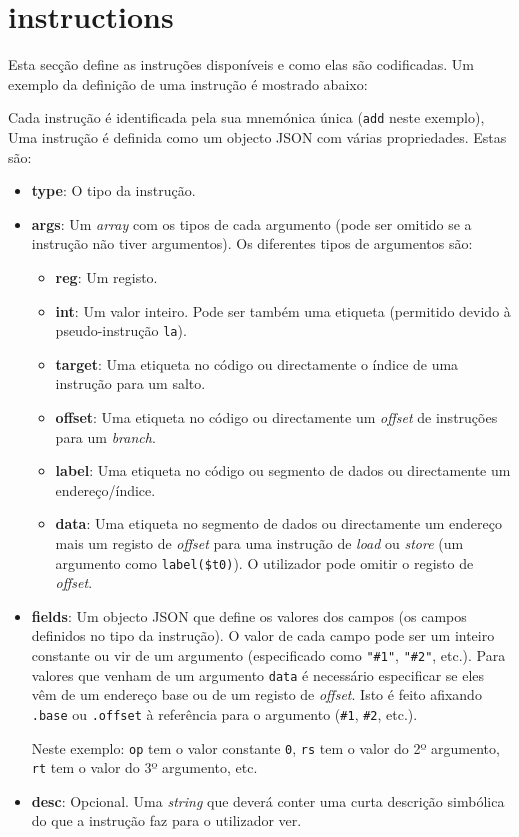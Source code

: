 \documentclass[11pt,a4paper,twoside,titlepage]{report}
\begin{document}
\section{instructions}

Esta secção define as instruções disponíveis e como elas são codificadas.
Um exemplo da definição de uma instrução é mostrado abaixo:



Cada instrução é identificada pela sua mnemónica única (\verb+add+ neste exemplo),
Uma instrução é definida como um objecto JSON com várias propriedades. Estas são:

\begin{itemize}
	\item \textbf{type}: O tipo da instrução.
	\item \textbf{args}: Um \emph{array} com os tipos de cada argumento (pode ser
		omitido se a instrução não tiver argumentos).
		Os diferentes tipos de argumentos são:
		\begin{itemize}
			\item \textbf{reg}: Um registo.
			\item \textbf{int}: Um valor inteiro. Pode ser também uma etiqueta
				(permitido devido à pseudo-instrução \verb+la+).
			\item \textbf{target}: Uma etiqueta no código ou directamente o índice de
				uma instrução para um salto.
			\item \textbf{offset}: Uma etiqueta no código ou directamente um
				\emph{offset} de instruções para um \emph{branch}.
			\item \textbf{label}: Uma etiqueta no código ou segmento de dados ou
				directamente um endereço/índice.
			\item \textbf{data}: Uma etiqueta no segmento de dados ou directamente um
				endereço mais um registo de \emph{offset} para uma instrução de
				\emph{load} ou \emph{store} (um argumento como \verb+label($t0)+). O
				utilizador pode omitir o registo de \emph{offset}.
		\end{itemize}
	\item \textbf{fields}: Um objecto JSON que define os valores dos campos (os
		campos definidos no tipo da instrução). O valor de cada campo pode ser
		um inteiro constante ou vir de um argumento (especificado como \verb+"#1"+,
		\verb+"#2"+, etc.).
		Para valores que venham de um argumento \verb+data+ é necessário especificar
		se eles vêm de um endereço base ou de um registo de \emph{offset}.
		Isto é feito afixando \verb+.base+ ou \verb+.offset+ à referência para o
		argumento (\verb+#1+, \verb+#2+, etc.).
		
		Neste exemplo: \verb+op+ tem o valor constante \verb+0+, \verb+rs+ tem
		o valor do 2º argumento, \verb+rt+ tem o valor do 3º argumento, etc.
	\item \textbf{desc}: Opcional. Uma \emph{string} que deverá conter uma
		curta descrição simbólica do que a instrução faz para o utilizador ver.
\end{itemize}
\end{document}
